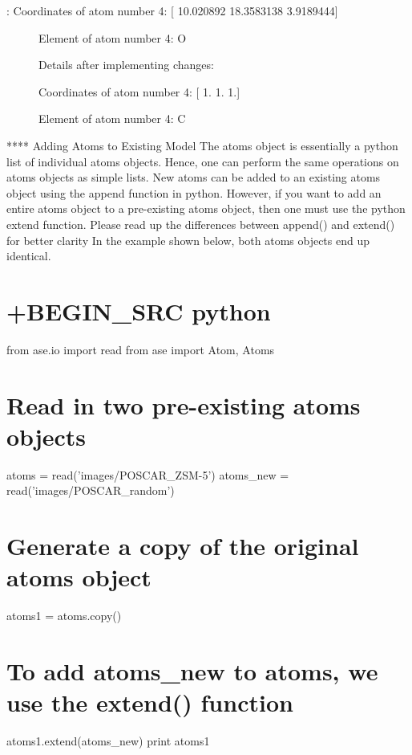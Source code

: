 \documentclass[11pt]{article}
\begin{document}
\begin{description}
\item[: Coordinates of atom number 4: {[} 10.020892 18.3583138
3.9189444{]}]
Element of atom number 4: O

Details after implementing changes:

Coordinates of atom number 4: {[} 1. 1. 1.{]}

Element of atom number 4: C
\end{description}

**** Adding Atoms to Existing Model The atoms object is essentially a
python list of individual atoms objects. Hence, one can perform the same
operations on atoms objects as simple lists. New atoms can be added to
an existing atoms object using the append function in python. However,
if you want to add an entire atoms object to a pre-existing atoms
object, then one must use the python extend function. Please read up the
differences between append() and extend() for better clarity In the
example shown below, both atoms objects end up identical.

\section{+BEGIN\_SRC python}\label{begin_src-python-7}

from ase.io import read from ase import Atom, Atoms

\section{Read in two pre-existing atoms
objects}\label{read-in-two-pre-existing-atoms-objects}

atoms = read('images/POSCAR\_ZSM-5') atoms\_new =
read('images/POSCAR\_random')

\section{Generate a copy of the original atoms
object}\label{generate-a-copy-of-the-original-atoms-object}

atoms1 = atoms.copy()

\section{To add atoms\_new to atoms, we use the extend()
function}\label{to-add-atoms_new-to-atoms-we-use-the-extend-function}

atoms1.extend(atoms\_new) print atoms1
\end{document}
